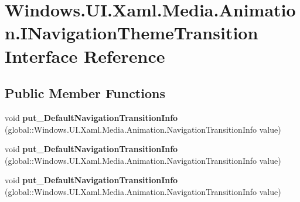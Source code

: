 \hypertarget{interface_windows_1_1_u_i_1_1_xaml_1_1_media_1_1_animation_1_1_i_navigation_theme_transition}{}\section{Windows.\+U\+I.\+Xaml.\+Media.\+Animation.\+I\+Navigation\+Theme\+Transition Interface Reference}
\label{interface_windows_1_1_u_i_1_1_xaml_1_1_media_1_1_animation_1_1_i_navigation_theme_transition}
\subsection*{Public Member Functions}
\begin{DoxyCompactItemize}
\item 
\mbox{\label{interface_windows_1_1_u_i_1_1_xaml_1_1_media_1_1_animation_1_1_i_navigation_theme_transition_ab149a0c0f7869628f2cf0732d48da116}} 
void {\bfseries put\+\_\+\+Default\+Navigation\+Transition\+Info} (global\+::\+Windows.\+U\+I.\+Xaml.\+Media.\+Animation.\+Navigation\+Transition\+Info value)
\item 
\mbox{\label{interface_windows_1_1_u_i_1_1_xaml_1_1_media_1_1_animation_1_1_i_navigation_theme_transition_ab149a0c0f7869628f2cf0732d48da116}} 
void {\bfseries put\+\_\+\+Default\+Navigation\+Transition\+Info} (global\+::\+Windows.\+U\+I.\+Xaml.\+Media.\+Animation.\+Navigation\+Transition\+Info value)
\item 
\mbox{\label{interface_windows_1_1_u_i_1_1_xaml_1_1_media_1_1_animation_1_1_i_navigation_theme_transition_ab149a0c0f7869628f2cf0732d48da116}} 
void {\bfseries put\+\_\+\+Default\+Navigation\+Transition\+Info} (global\+::\+Windows.\+U\+I.\+Xaml.\+Media.\+Animation.\+Navigation\+Transition\+Info value)
\item 
\mbox{\label{interface_windows_1_1_u_i_1_1_xaml_1_1_media_1_1_animation_1_1_i_navigation_theme_transition_ab149a0c0f7869628f2cf0732d48da116}} 

\end{DoxyCompactItemize}

